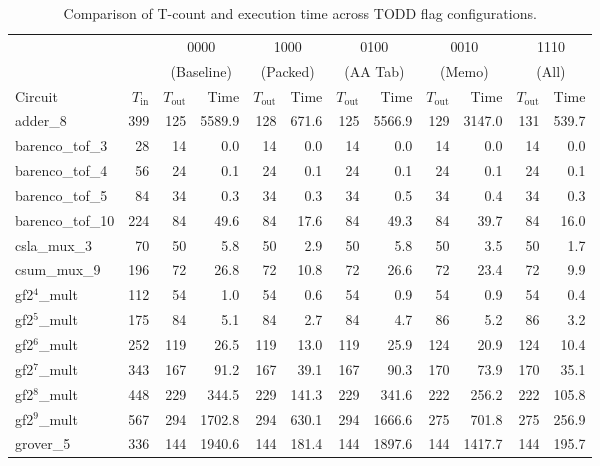 
\begin{table}[htbp]
\centering
\caption{Comparison of T-count and execution time across TODD flag configurations.}
\label{tab:flag_comparison}
\footnotesize
\begin{tabular}{l|r|rr|rr|rr|rr|rr}
\hline
 & & \multicolumn{2}{c|}{0000} & \multicolumn{2}{c|}{1000} & \multicolumn{2}{c|}{0100} & \multicolumn{2}{c|}{0010} & \multicolumn{2}{c}{1110} \\
 & & \multicolumn{2}{c|}{(Baseline)} & \multicolumn{2}{c|}{(Packed)} & \multicolumn{2}{c|}{(AA Tab)} & \multicolumn{2}{c|}{(Memo)} & \multicolumn{2}{c}{(All)} \\
Circuit & $T_\mathrm{in}$ & $T_\mathrm{out}$ & Time & $T_\mathrm{out}$ & Time & $T_\mathrm{out}$ & Time & $T_\mathrm{out}$ & Time & $T_\mathrm{out}$ & Time \\
\hline
adder\_8        & 399 & 125 & 5589.9 & 128 &  671.6 & 125 & 5566.9 & 129 & 3147.0 & 131 &  539.7 \\
barenco\_tof\_3  &  28 &  14 &    0.0 &  14 &    0.0 &  14 &    0.0 &  14 &    0.0 &  14 &    0.0 \\
barenco\_tof\_4  &  56 &  24 &    0.1 &  24 &    0.1 &  24 &    0.1 &  24 &    0.1 &  24 &    0.1 \\
barenco\_tof\_5  &  84 &  34 &    0.3 &  34 &    0.3 &  34 &    0.5 &  34 &    0.4 &  34 &    0.3 \\
barenco\_tof\_10 & 224 &  84 &   49.6 &  84 &   17.6 &  84 &   49.3 &  84 &   39.7 &  84 &   16.0 \\
csla\_mux\_3     &  70 &  50 &    5.8 &  50 &    2.9 &  50 &    5.8 &  50 &    3.5 &  50 &    1.7 \\
csum\_mux\_9     & 196 &  72 &   26.8 &  72 &   10.8 &  72 &   26.6 &  72 &   23.4 &  72 &    9.9 \\
gf2$^4$\_mult    & 112 &  54 &    1.0 &  54 &    0.6 &  54 &    0.9 &  54 &    0.9 &  54 &    0.4 \\
gf2$^5$\_mult    & 175 &  84 &    5.1 &  84 &    2.7 &  84 &    4.7 &  86 &    5.2 &  86 &    3.2 \\
gf2$^6$\_mult    & 252 & 119 &   26.5 & 119 &   13.0 & 119 &   25.9 & 124 &   20.9 & 124 &   10.4 \\
gf2$^7$\_mult    & 343 & 167 &   91.2 & 167 &   39.1 & 167 &   90.3 & 170 &   73.9 & 170 &   35.1 \\
gf2$^8$\_mult    & 448 & 229 &  344.5 & 229 &  141.3 & 229 &  341.6 & 222 &  256.2 & 222 &  105.8 \\
gf2$^9$\_mult    & 567 & 294 & 1702.8 & 294 &  630.1 & 294 & 1666.6 & 275 &  701.8 & 275 &  256.9 \\
grover\_5        & 336 & 144 & 1940.6 & 144 &  181.4 & 144 & 1897.6 & 144 & 1417.7 & 144 &  195.7 \\
\hline
\end{tabular}
\end{table}


